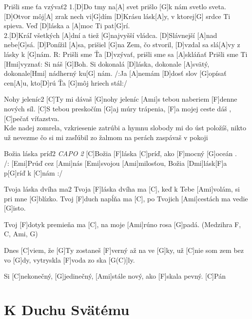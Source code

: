 \documentclass[12pt]{article}
\begin{document}
\begin{song}{Prišli sme ťa vzývať}{2}
	1.[D]Do tmy na[A] svet 
	prišlo [G]k nám svetlo sveta.
	[D]Otvor môj[A] zrak nech vi[G]dím
	[D]Krásu lásk[A]y, v ktorej[G] srdce Ti spieva.
	Veď [D]láska a [A]moc Ti pat[G]rí.
	\\
	2.[D]Kráľ všetkých [A]dní 
	a tiež [G]najvyšší vládca.
	[D]Slávnejší [A]nad nebe[G]sá.
	[D]Ponížil [A]sa, prišiel [G]na Zem, čo stvoril,
	[D]vzdal sa slá[A]vy z lásky k [G]nám.
	\columnbreak
	R: Prišli sme Ťa [D]vzývať, 
	prišli sme sa [A]skláňať
	Prišli sme Ti [Hmi]vyznať: Si náš [G]Boh.
	Si dokonalá [D]láska, dokonale [A]svätý,
	dokonale[Hmi] nádherný ku[G] nám.
	/:Ja [A]nemám [D]dosť slov [G]opísať 
	cen[A]u, kto[D]rú Ťa [G]môj hriech stál:/
\end{song}

\begin{song}{Nohy jeleníc}{2}
	[C]Ty mi dávaš [G]nohy jeleníc
	[Ami]s tebou naberiem [F]denne nových síl.
	[C]S tebou preskočím [G]aj múry trápenia,
	[F]a mojej ceste dáš , [C]pečať víťazstva.
	\\
	Kde nadej zomrela, vzkriesenie zatrúbi
	a hymnu slobody mi do úst položíš,
	nikto už nevezme čo si mi zasľúbil
	zo žalmom na perách zaspávaš v pokoji
\end{song}

\begin{song}{Božia láska príď}{2}
	\textit{CAPO 2}
	[C]Božia [F]láska [C]príď, ako [F]mocný [G]oceán .
	\\
	/: [Emi]Prúď cez [Ami]nás [Emi]svojou [Ami]milosťou, 
	Božia [Dmi]lásk[F]a p[G]ríď k [C]nám :/
	\columnbreak
\end{song}

\begin{song}{Tvoja láska dvíha ma}{2}
Tvoja [F]láska dvíha ma [C], keď k Tebe [Ami]volám, si pri mne [G]blízko.
Tvoj [F]duch napĺňa ma [C], po Tvojich [Ami]cestách ma vedie [G]isto.

Tvoj [F]dotyk premieňa ma [C], 
na moje [Ami]rúno rosa [G]padá.
\columnbreak
(Medzihra F, C, Ami, G)

Dnes [C]viem, že [G]Ty zostaneš [F]verný až na ve [G]ky,
už [C]nie som zem bez vo [G]dy, vytryskla [F]voda zo ska [G(C)]ly.

Si [C]nekonečný, [G]jedinečný, [Ami]stále nový, ako [F]skala pevný. [C]Pán
\end{song}

\newpage
\section{K Duchu Svätému}
\end{document}
